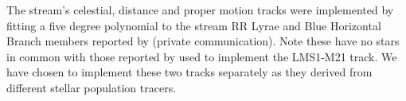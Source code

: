 The stream's celestial, distance and proper motion tracks were implemented by fitting a five degree polynomial to the stream RR Lyrae and Blue Horizontal Branch members reported by \citet{Yuan2020} (private communication). Note these have no stars in common with those reported by \citet{Malhan2021} used to implement the LMS1-M21 track. We have chosen to implement these two tracks separately as they derived from different stellar population tracers.
